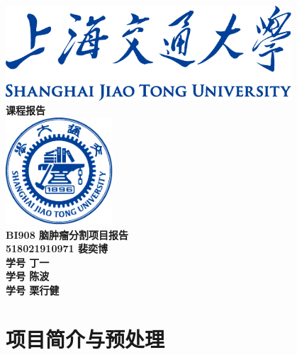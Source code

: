 \documentclass[UTF8]{ctexart}
\begin{document}
\begin{titlepage}
    \begin{center}
        \includegraphics[width=0.8\textwidth]{sjtu-name-blue.pdf}\\[1cm]
        \textsc{\Huge \bfseries 课程报告}\\[1.5cm]
        \includegraphics[width=0.3\textwidth]{sjtu-badge-blue.pdf}\\[0.5cm]    

        \Huge \bfseries{BI908 脑肿瘤分割项目报告}\\[1cm]
        \Large \bfseries{518021910971 裴奕博}\\
        \Large \bfseries{学号 丁一}\\
        \Large \bfseries{学号 陈波}\\
        \Large \bfseries{学号 栗行健}
    \end{center}
\end{titlepage}
\tableofcontents

\newpage
\section{项目简介与预处理}
\end{document}
